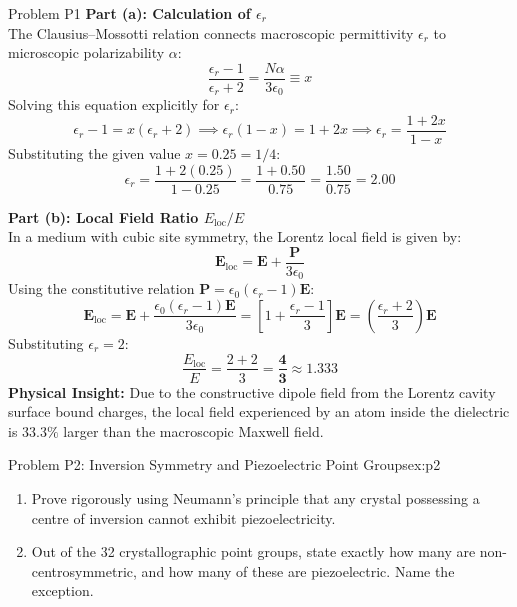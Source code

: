 \documentclass[11pt,a4paper]{article}
\begin{document}
\begin{solbox}{Problem P1}
\textbf{Part (a): Calculation of $\epsilon_r$} \\
The Clausius--Mossotti relation connects macroscopic permittivity $\epsilon_r$ to microscopic polarizability $\alpha$:
\begin{equation}
    \frac{\epsilon_r - 1}{\epsilon_r + 2} = \frac{N\alpha}{3\epsilon_0} \equiv x
\end{equation}
Solving this equation explicitly for $\epsilon_r$:
\begin{equation}
    \epsilon_r - 1 = x(\epsilon_r + 2) \implies \epsilon_r(1 - x) = 1 + 2x \implies \epsilon_r = \frac{1 + 2x}{1 - x}
\end{equation}
Substituting the given value $x = 0.25 = 1/4$:
\begin{equation}
    \epsilon_r = \frac{1 + 2(0.25)}{1 - 0.25} = \frac{1 + 0.50}{0.75} = \frac{1.50}{0.75} = \mathbf{2.00}
\end{equation}

\textbf{Part (b): Local Field Ratio $E_{\text{loc}}/E$} \\
In a medium with cubic site symmetry, the Lorentz local field is given by:
\begin{equation}
    \mathbf{E}_{\text{loc}} = \mathbf{E} + \frac{\mathbf{P}}{3\epsilon_0}
\end{equation}
Using the constitutive relation $\mathbf{P} = \epsilon_0(\epsilon_r - 1)\mathbf{E}$:
\begin{equation}
    \mathbf{E}_{\text{loc}} = \mathbf{E} + \frac{\epsilon_0(\epsilon_r - 1)\mathbf{E}}{3\epsilon_0} = \left[1 + \frac{\epsilon_r - 1}{3}\right]\mathbf{E} = \left(\frac{\epsilon_r + 2}{3}\right)\mathbf{E}
\end{equation}
Substituting $\epsilon_r = 2$:
\begin{equation}
    \frac{E_{\text{loc}}}{E} = \frac{2 + 2}{3} = \mathbf{\frac{4}{3}} \approx 1.333
\end{equation}
\textbf{Physical Insight:} Due to the constructive dipole field from the Lorentz cavity surface bound charges, the local field experienced by an atom inside the dielectric is $33.3\%$ larger than the macroscopic Maxwell field.
\end{solbox}

\vspace{0.4cm}

\begin{examplebox}{Problem P2: Inversion Symmetry and Piezoelectric Point Groups}{ex:p2}
\begin{enumerate}[label=(\alph*), leftmargin=*]
    \item Prove rigorously using Neumann's principle that any crystal possessing a centre of inversion cannot exhibit piezoelectricity.
    \item Out of the 32 crystallographic point groups, state exactly how many are non-centrosymmetric, and how many of these are piezoelectric. Name the exception.
\end{enumerate}
\end{examplebox}
\end{document}
